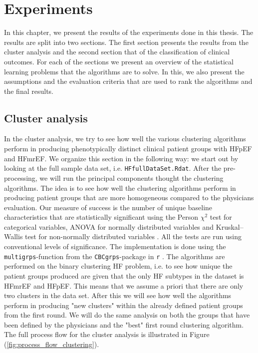 \documentclass[../thesis.tex]{subfiles}
\begin{document}
\chapter{Experiments}
\label{chap:exp}

\noindent In this chapter, we present the results of the experiments done in this thesis. The results are split into two sections. The first section presents the results from the cluster analysis and the second section that of the classification of clinical outcomes. For each of the sections we present an overview of the statistical learning problems that the algorithms are to solve. In this, we also present the assumptions and the evaluation criteria that are used to rank the algorithms and the final results. 

\section{Cluster analysis}

\noindent In the cluster analysis, we try to see how well the various clustering algorithms perform in producing phenotypically distinct clinical patient groups with HFpEF and HFmrEF. We organize this section in the following way: we start out by looking at the full sample data set, i.e. \texttt{HFfullDataSet.Rdat}. After the pre-processing, we will run the principal components thought the clustering algorithms. The idea is to see how well the clustering algorithms perform in producing patient groups that are more homogeneous compared to the physicians evaluation. Our measure of success is the number of unique baseline characteristics that are statistically significant using the Person $\chi^2$ test for categorical variables, ANOVA for normally distributed variables and Kruskal–Wallis test for non-normally distributed variables \citep{kruskal1952use}. All the tests are run using conventional levels of significance. The implementation is done using the \texttt{multigrps}-function from the \texttt{CBCgrps}-package in \texttt{r} \citep{CBCgrps}. The algorithms are performed on the binary clustering HF problem, i.e. to see how unique the patient groups produced are given that the only HF subtypes in the dataset is HFmrEF and HFpEF. This means that we assume a priori that there are only two clusters in the data set. After this we will see how well the algorithms perform in producing "new clusters" within the already defined patient groups from the first round. We will do the same analysis on both the groups that have been defined by the physicians and the "best" first round clustering algorithm. The full process flow for the cluster analysis is illustrated in Figure (\ref{fig:process_flow_clustering}).
\end{document}
